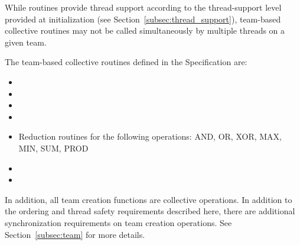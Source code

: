 While \openshmem routines provide thread support according to the
thread-support level provided at initialization (see
Section~\ref{subsec:thread_support}), team-based collective routines
may not be called simultaneously by multiple threads on a given team.

The team-based collective routines defined in the \openshmem Specification are:

\begin{itemize}
\item {}
\item {}
\item {}
\item {}
\item Reduction routines for the following operations: AND, OR, XOR, MAX, MIN, SUM, PROD
\item {}
\item {}
\end{itemize}

In addition, all team creation functions are collective operations. In addition to the ordering
and thread safety requirements described here, there are additional synchronization requirements
on team creation operations. See Section~\ref{subsec:team} for more details.

